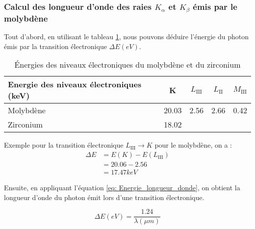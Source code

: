 






\subsubsection{Calcul des longueur d'onde des raies $K_{\alpha}$ et $K_{\beta}$ émis par le molybdène}


Tout d'abord, en utilisant le tableau \ref{tab: Tableau des nergies de niveaux lectroniques du Molybdne et du Zirconium}, nous pouvons déduire l'énergie du photon émis par la transition électronique $\Delta E(eV)$. 

\begin{table}[h!]
	\centering
	\begin{tabular}{|l|c|c|c|c|}
		\hline
		\textbf{Energie des niveaux électroniques (keV)} & K     & $L_{\mathrm{III}}$ &$L_{\mathrm{II}}$ & $M_{\mathrm{III}}$ \\ \hline
		Molybdène                                        & 20.03 & 2.56 & 2.66 & 0.42 \\ \hline
		Zirconium                                        & 18.02 &      &      &      \\ \hline
	\end{tabular}
	\caption{Énergies des niveaux électroniques du molybdène et du zirconium}
	\label{tab: Tableau des nergies de niveaux lectroniques du Molybdne et du Zirconium}
\end{table}


Exemple pour la transition électronique $L_{\mathrm{III}} \to K$ pour le molybdène, on a : 
\vspace{0.2cm}
\begin{equation*}	
	\begin{split}
		\Delta E  & = E(K) - E(L_{\mathrm{III}})  \\
		& = 20.06 - 2.56  \\
		& = 17.47keV
	\end{split}	
\end{equation*}

Ensuite, en appliquant l'équation \ref{eq: Energie_longueur_donde}, on obtient la longueur d'onde du photon émit lors d'une transition électronique.

\begin{equation}\label{eq: Energie_longueur_donde}
	\Delta E(eV) = \frac{1.24}{\lambda (\mu m)}
\end{equation}

